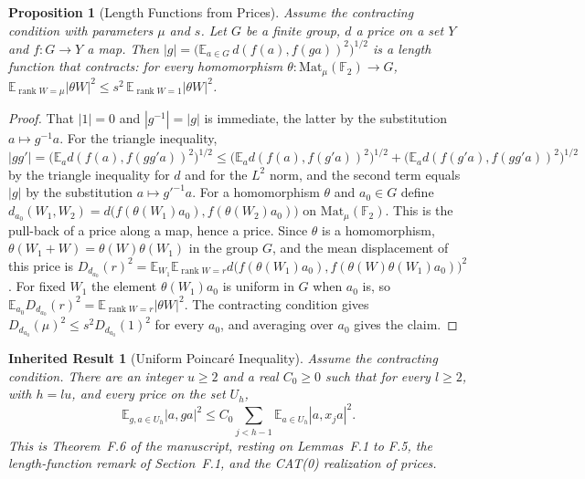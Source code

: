 \documentclass[11pt,letterpaper]{report}
\theoremstyle{plain}
\newtheorem{proposition}[theorem]{Proposition}
\newtheorem{inherited}[theorem]{Inherited Result}
\theoremstyle{definition}
\theoremstyle{remark}
\begin{document}
\begin{proposition}[Length Functions from Prices]\label{pr:lengthfn}
Assume the contracting condition with parameters $\mu$ and $s$. Let $G$ be a finite group, $d$ a price on a set $Y$ and $f:G\to Y$ a map. Then $|g|=\bigl(\mathbb E_{a\in G}\,d(f(a),f(ga))^2\bigr)^{1/2}$ is a length function that contracts: for every homomorphism $\theta:\mathrm{Mat}_\mu(\mathbb F_2)\to G$, $\mathbb E_{\operatorname{rank}W=\mu}|\theta W|^2\le s^2\,\mathbb E_{\operatorname{rank}W=1}|\theta W|^2$.
\end{proposition}
\begin{proof}
That $|1|=0$ and $|g^{-1}|=|g|$ is immediate, the latter by the substitution $a\mapsto g^{-1}a$. For the triangle inequality, $|gg'|=\bigl(\mathbb E_a d(f(a),f(gg'a))^2\bigr)^{1/2}\le\bigl(\mathbb E_ad(f(a),f(g'a))^2\bigr)^{1/2}+\bigl(\mathbb E_ad(f(g'a),f(gg'a))^2\bigr)^{1/2}$ by the triangle inequality for $d$ and for the $L^2$ norm, and the second term equals $|g|$ by the substitution $a\mapsto g'^{-1}a$. For a homomorphism $\theta$ and $a_0\in G$ define $d_{a_0}(W_1,W_2)=d\bigl(f(\theta(W_1)a_0),f(\theta(W_2)a_0)\bigr)$ on $\mathrm{Mat}_\mu(\mathbb F_2)$. This is the pull-back of a price along a map, hence a price. Since $\theta$ is a homomorphism, $\theta(W_1+W)=\theta(W)\theta(W_1)$ in the group $G$, and the mean displacement of this price is $D_{d_{a_0}}(r)^2=\mathbb E_{W_1}\mathbb E_{\operatorname{rank}W=r}d\bigl(f(\theta(W_1)a_0),f(\theta(W)\theta(W_1)a_0)\bigr)^2$. For fixed $W_1$ the element $\theta(W_1)a_0$ is uniform in $G$ when $a_0$ is, so $\mathbb E_{a_0}D_{d_{a_0}}(r)^2=\mathbb E_{\operatorname{rank}W=r}|\theta W|^2$. The contracting condition gives $D_{d_{a_0}}(\mu)^2\le s^2D_{d_{a_0}}(1)^2$ for every $a_0$, and averaging over $a_0$ gives the claim.
\end{proof}

\begin{inherited}[Uniform Poincar\'e Inequality]\label{inh:poincare}
Assume the contracting condition. There are an integer $u\ge2$ and a real $C_0\ge0$ such that for every $l\ge2$, with $h=lu$, and every price on the set $U_h$,
\[
\mathbb E_{g,a\in U_h}|a,ga|^2\le C_0\sum_{j<h-1}\mathbb E_{a\in U_h}|a,x_ja|^2.
\]
This is Theorem~F.6 of the manuscript, resting on Lemmas~F.1 to F.5, the length-function remark of Section~F.1, and the CAT(0) realization of prices.
\end{inherited}
\end{document}
